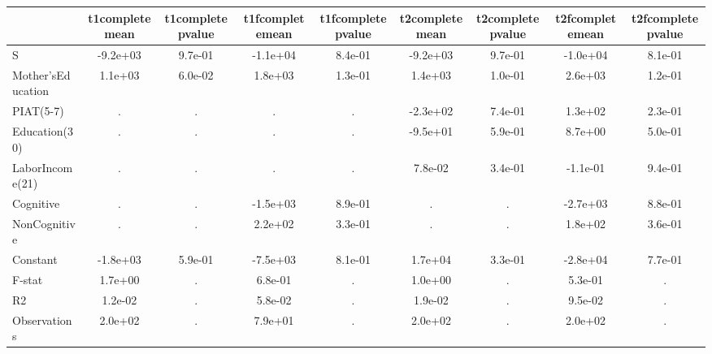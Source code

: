 \begin{table}[htbp]
\begin{tabular}{lcccccccc} \hline \hline
 & t1completemean  & t1completepvalue  & t1fcompletemean  & t1fcompletepvalue  & t2completemean  & t2completepvalue  & t2fcompletemean  & t2fcompletepvalue  \\  \hline 
S & -9.2e+03 &  9.7e-01 & -1.1e+04 &  8.4e-01 & -9.2e+03 &  9.7e-01 & -1.0e+04 &  8.1e-01 \\  
Mother'sEducation &  1.1e+03 &  6.0e-02 &  1.8e+03 &  1.3e-01 &  1.4e+03 &  1.0e-01 &  2.6e+03 &  1.2e-01 \\  
PIAT(5-7) &         . &         . &         . &         . & -2.3e+02 &  7.4e-01 &  1.3e+02 &  2.3e-01 \\  
Education(30) &         . &         . &         . &         . & -9.5e+01 &  5.9e-01 &  8.7e+00 &  5.0e-01 \\  
LaborIncome(21) &         . &         . &         . &         . &  7.8e-02 &  3.4e-01 & -1.1e-01 &  9.4e-01 \\  
Cognitive &         . &         . & -1.5e+03 &  8.9e-01 &         . &         . & -2.7e+03 &  8.8e-01 \\  
NonCognitive &         . &         . &  2.2e+02 &  3.3e-01 &         . &         . &  1.8e+02 &  3.6e-01 \\  
Constant & -1.8e+03 &  5.9e-01 & -7.5e+03 &  8.1e-01 &  1.7e+04 &  3.3e-01 & -2.8e+04 &  7.7e-01 \\  
F-stat &  1.7e+00 &         . &  6.8e-01 &         . &  1.0e+00 &         . &  5.3e-01 &         . \\  
R2 &  1.2e-02 &         . &  5.8e-02 &         . &  1.9e-02 &         . &  9.5e-02 &         . \\  
Observations &  2.0e+02 &         . &  7.9e+01 &         . &  2.0e+02 &         . &  2.0e+02 &         . \\  
\hline \hline \end{tabular}
\end{table}
